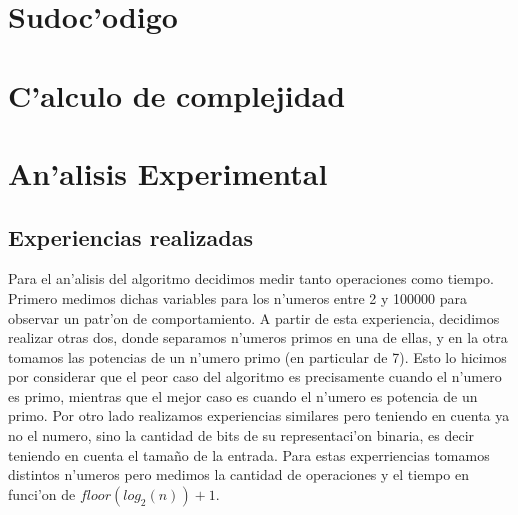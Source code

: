 \section{Sudoc'odigo}


\section{C'alculo de complejidad}

\section{An'alisis Experimental}
\subsection{Experiencias realizadas}
Para el an'alisis del algoritmo decidimos medir tanto operaciones como tiempo. Primero medimos dichas variables 
para los n'umeros entre 2 y 100000 para observar un patr'on de comportamiento. A partir de esta experiencia, 
decidimos realizar otras dos, donde separamos n'umeros primos en una de ellas, y en la otra tomamos las potencias 
de un n'umero primo (en particular de 7). Esto lo hicimos por considerar que el peor caso del algoritmo es 
precisamente cuando el n'umero es primo, mientras que el mejor caso es cuando el n'umero es potencia de un primo. 
Por otro lado realizamos experiencias similares pero teniendo en cuenta ya no el numero, sino la cantidad de bits 
de su representaci'on binaria, es decir teniendo en cuenta el tama\~{n}o de la entrada. Para estas experriencias 
tomamos distintos n'umeros pero medimos la cantidad de operaciones y el tiempo en funci'on de $floor(log_2(n)) + 1$.


